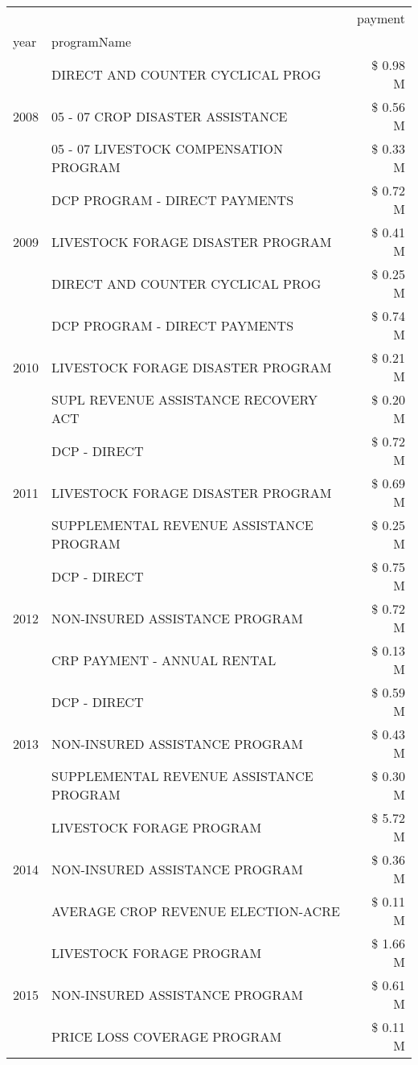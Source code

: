 \begin{tabular}{llr}
\toprule
 &  & payment \\
year & programName &  \\
\midrule
\multirow[t]{3}{*}{2008} & DIRECT AND COUNTER CYCLICAL PROG & \$ 0.98 M \\
 & 05 - 07 CROP DISASTER ASSISTANCE & \$ 0.56 M \\
 & 05 - 07 LIVESTOCK COMPENSATION PROGRAM & \$ 0.33 M \\
\cline{1-3}
\multirow[t]{3}{*}{2009} & DCP PROGRAM - DIRECT PAYMENTS & \$ 0.72 M \\
 & LIVESTOCK FORAGE DISASTER  PROGRAM & \$ 0.41 M \\
 & DIRECT AND COUNTER CYCLICAL PROG & \$ 0.25 M \\
\cline{1-3}
\multirow[t]{3}{*}{2010} & DCP PROGRAM - DIRECT PAYMENTS & \$ 0.74 M \\
 & LIVESTOCK FORAGE DISASTER  PROGRAM & \$ 0.21 M \\
 & SUPL REVENUE ASSISTANCE RECOVERY ACT & \$ 0.20 M \\
\cline{1-3}
\multirow[t]{3}{*}{2011} & DCP - DIRECT & \$ 0.72 M \\
 & LIVESTOCK FORAGE DISASTER PROGRAM & \$ 0.69 M \\
 & SUPPLEMENTAL REVENUE ASSISTANCE PROGRAM & \$ 0.25 M \\
\cline{1-3}
\multirow[t]{3}{*}{2012} & DCP - DIRECT & \$ 0.75 M \\
 & NON-INSURED ASSISTANCE PROGRAM & \$ 0.72 M \\
 & CRP PAYMENT - ANNUAL RENTAL & \$ 0.13 M \\
\cline{1-3}
\multirow[t]{3}{*}{2013} & DCP - DIRECT & \$ 0.59 M \\
 & NON-INSURED ASSISTANCE PROGRAM & \$ 0.43 M \\
 & SUPPLEMENTAL REVENUE ASSISTANCE PROGRAM & \$ 0.30 M \\
\cline{1-3}
\multirow[t]{3}{*}{2014} & LIVESTOCK FORAGE PROGRAM & \$ 5.72 M \\
 & NON-INSURED ASSISTANCE PROGRAM & \$ 0.36 M \\
 & AVERAGE CROP REVENUE ELECTION-ACRE & \$ 0.11 M \\
\cline{1-3}
\multirow[t]{3}{*}{2015} & LIVESTOCK FORAGE PROGRAM & \$ 1.66 M \\
 & NON-INSURED ASSISTANCE PROGRAM & \$ 0.61 M \\
 & PRICE LOSS COVERAGE PROGRAM & \$ 0.11 M \\
\cline{1-3}

\end{tabular}
